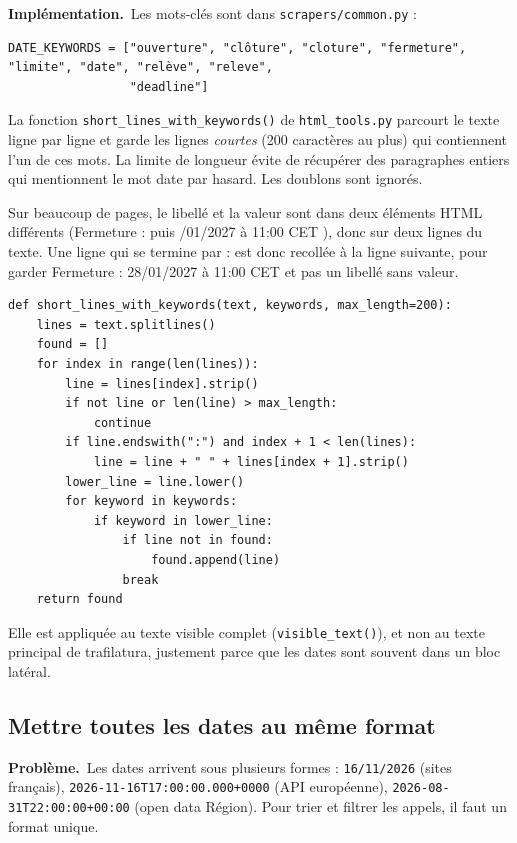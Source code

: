 \documentclass[11pt,a4paper]{article}
\newcommand{\pb}{\par\medskip\noindent\textbf{\textcolor{pbcolor}{Problème.}}\ }
\newcommand{\impl}{\par\medskip\noindent\textbf{\textcolor{implcolor}{Implémentation.}}\ }
\newcommand{\code}[1]{\texttt{#1}}
\begin{document}
\impl Les mots-clés sont dans \code{scrapers/common.py} :

\begin{lstlisting}
DATE_KEYWORDS = ["ouverture", "clôture", "cloture", "fermeture", "limite", "date", "relève", "releve",
                 "deadline"]
\end{lstlisting}

La fonction \code{short\_lines\_with\_keywords()} de \code{html\_tools.py} parcourt le texte
ligne par ligne et garde les lignes \emph{courtes} (200 caractères au plus) qui contiennent
l'un de ces mots. La limite de longueur évite de récupérer des paragraphes entiers qui
mentionnent le mot \og date \fg{} par hasard. Les doublons sont ignorés.

Sur beaucoup de pages, le libellé et la valeur sont dans deux éléments HTML différents
(\og Fermeture : \fg{} puis /01/2027 à 11:00 CET \fg), donc sur deux lignes du texte.
Une ligne qui se termine par \og : \fg{} est donc recollée à la ligne suivante, pour garder
\og Fermeture : 28/01/2027 à 11:00 CET \fg{} et pas un libellé sans valeur.

\begin{lstlisting}
def short_lines_with_keywords(text, keywords, max_length=200):
    lines = text.splitlines()
    found = []
    for index in range(len(lines)):
        line = lines[index].strip()
        if not line or len(line) > max_length:
            continue
        if line.endswith(":") and index + 1 < len(lines):
            line = line + " " + lines[index + 1].strip()
        lower_line = line.lower()
        for keyword in keywords:
            if keyword in lower_line:
                if line not in found:
                    found.append(line)
                break
    return found
\end{lstlisting}

Elle est appliquée au texte visible complet (\code{visible\_text()}), et non au texte
principal de trafilatura, justement parce que les dates sont souvent dans un bloc latéral.

\subsection{Mettre toutes les dates au même format}

\pb Les dates arrivent sous plusieurs formes : \code{16/11/2026} (sites français),
\code{2026-11-16T17:00:00.000+0000} (API européenne), \code{2026-08-31T22:00:00+00:00}
(open data Région). Pour trier et filtrer les appels, il faut un format unique.
\end{document}
